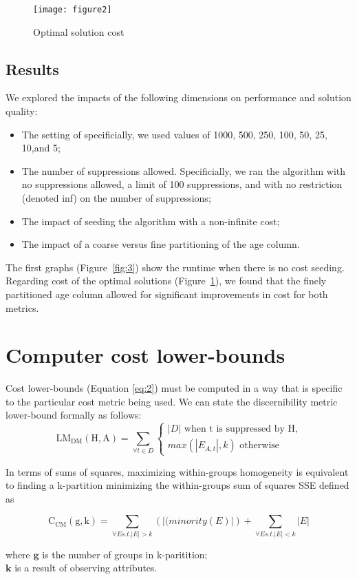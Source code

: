 \documentclass[]{seismica}
\begin{document}
   \begin{figure}[ht!]
       \texttt{[image: figure2]}
       \caption{Optimal solution cost}
       \label{fig:4}
   \end{figure}

	\subsection{Results}
	We explored the impacts of the following dimensions on performance and solution quality:

    \begin{itemize}
        \item The setting of specificially, we used values of 1000, 500, 250, 100, 50, 25, 10,and 5;
        \item The number of suppressions allowed. Specificially, we ran the algorithm with no suppressions allowed, a limit of 100 suppressions, and with no restriction (denoted inf) on the number of suppressions;
        \item The impact of seeding the algorithm with a non-infinite cost;
        \item The impact of a coarse versus fine partitioning of the age column.
    \end{itemize}

    The first graphs (Figure~\ref{fig:3}) show the runtime when there is no cost seeding. Regarding cost of the optimal solutions (Figure~\ref{fig:4}), we found that the finely partitioned age column allowed for significant improvements in cost for both metrics.

    \section{Computer cost lower-bounds}
    Cost lower-bounds (Equation \ref{eq:2}) must be computed in a way that is specific to the particular cost metric being used. We can state the discernibility metric lower-bound formally as follows:
    \begin{equation} \label{eq:2}
    \mathrm{LM_{DM}(H,A)} = \sum_{\forall t \in D}
    \begin{cases}
        \left | D \right | \text{ when t is suppressed by H,}\\
        max(\left | E_{A,t} \right |, k) \text{ otherwise}
    \end{cases}
    \end{equation}

    In terms of sums of squares, maximizing within-groups homogeneity is equivalent to finding a k-partition minimizing the within-groups sum of squares SSE defined as

    \begin{equation}
        \mathrm{C_{CM}(g,k)} = \sum_{\forall E s.t. \left | E \right | > k}
        (\left | (minority(E) \right |) + \sum_{\forall E s.t. \left | E \right | < k}
        \left | E \right |
    \end{equation}

    where $\mathbf{g}$ is the number of groups in k-paritition;\\
    $\mathbf{k}$ is a result of observing attributes.
\end{document}
